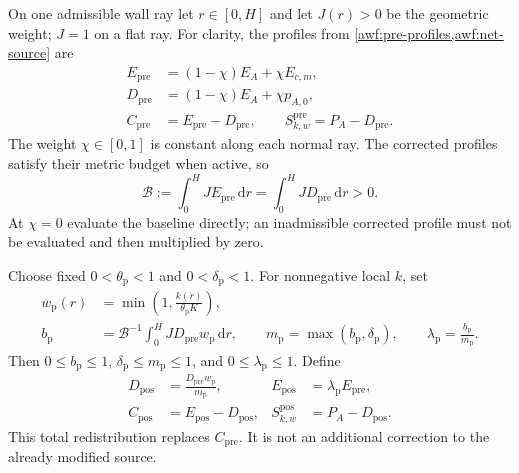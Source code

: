 \documentclass[11pt,a4paper]{article}
\numberwithin{equation}{section}
\newcommand{\dd}{\mathrm d}
\begin{document}
On one admissible wall ray let $r\in[0,H]$ and let $J(r)>0$ be the
geometric weight; $J=1$ on a flat ray. For clarity, the profiles
from \cref{awf:pre-profiles,awf:net-source} are
\begin{equation}
 \begin{aligned}
 E_{\mathrm{pre}}&=(1-\chi)E_A+\chi E_{c,m},\\
 D_{\mathrm{pre}}&=(1-\chi)E_A+\chi p_{A,0},\\
 C_{\mathrm{pre}}&=E_{\mathrm{pre}}-D_{\mathrm{pre}},\qquad
 S_{k,w}^{\mathrm{pre}}=P_A-D_{\mathrm{pre}}.
 \end{aligned}
 \label{st:pre-profiles}
\end{equation}
The weight $\chi\in[0,1]$ is constant along each normal ray.
The corrected profiles satisfy their metric budget when active,
so
\begin{equation}
 \mathcal B:=\int_0^HJ E_{\mathrm{pre}}\,\dd r
            =\int_0^HJ D_{\mathrm{pre}}\,\dd r>0.
 \label{st:pre-budget}
\end{equation}
At $\chi=0$ evaluate the baseline directly; an inadmissible
corrected profile must not be evaluated and then multiplied by zero.

Choose fixed $0<\theta_{\mathrm p}<1$ and
$0<\delta_{\mathrm p}<1$. For nonnegative local $k$, set
\begin{equation}
 \begin{aligned}
 w_{\mathrm p}(r)&=\min\left(1,\frac{k(r)}{\theta_{\mathrm p}K}\right),\\
 b_{\mathrm p}&=\mathcal B^{-1}
        \int_0^HJ D_{\mathrm{pre}}w_{\mathrm p}\,\dd r,\qquad
 m_{\mathrm p}=\max(b_{\mathrm p},\delta_{\mathrm p}),\qquad
 \lambda_{\mathrm p}=\frac{b_{\mathrm p}}{m_{\mathrm p}} .
 \end{aligned}
 \label{st:normalization}
\end{equation}
Then $0\le b_{\mathrm p}\le1$,
$\delta_{\mathrm p}\le m_{\mathrm p}\le1$, and
$0\le\lambda_{\mathrm p}\le1$. Define
\begin{equation}
 \boxed{
 \begin{aligned}
 D_{\mathrm{pos}}&=\frac{D_{\mathrm{pre}}w_{\mathrm p}}{m_{\mathrm p}},
 &E_{\mathrm{pos}}&=\lambda_{\mathrm p}E_{\mathrm{pre}},\\
 C_{\mathrm{pos}}&=E_{\mathrm{pos}}-D_{\mathrm{pos}},
 &S_{k,w}^{\mathrm{pos}}&=P_A-D_{\mathrm{pos}} .
 \end{aligned}}
 \label{st:positive-profiles}
\end{equation}
This total redistribution replaces $C_{\mathrm{pre}}$.
It is not an additional correction to the already modified source.
\end{document}
